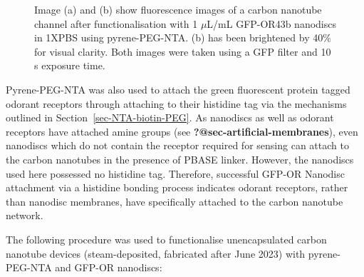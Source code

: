 \documentclass[
  a4paper,
]{scrbook}
\begin{document}
\begin{figure}
\begin{minipage}[t]{0.47\linewidth}
{{}

}

\subcaption{\label{fig-PPN-GFP-OR-2}}
\end{minipage}%

\caption{\label{fig-OR-GFP-PPN}Image (a) and (b) show fluorescence
images of a carbon nanotube channel after functionalisation with 1
\(\mu\)L/mL GFP-OR43b nanodiscs in 1XPBS using pyrene-PEG-NTA. (b) has
been brightened by 40\% for visual clarity. Both images were taken using
a GFP filter and 10 s exposure time.}

\end{figure}

Pyrene-PEG-NTA was also used to attach the green fluorescent protein
tagged odorant receptors through attaching to their histidine tag via
the mechanisms outlined in Section~\ref{sec-NTA-biotin-PEG}. As
nanodiscs as well as odorant receptors have attached amine groups (see
\textbf{?@sec-artificial-membranes}), even nanodiscs which do not
contain the receptor required for sensing can attach to the carbon
nanotubes in the presence of PBASE linker. However, the nanodiscs used
here possessed no histidine tag. Therefore, successful GFP-OR Nanodisc
attachment via a histidine bonding process indicates odorant receptors,
rather than nanodisc membranes, have specifically attached to the carbon
nanotube network.

The following procedure was used to functionalise unencapsulated carbon
nanotube devices (steam-deposited, fabricated after June 2023) with
pyrene-PEG-NTA and GFP-OR nanodiscs:
\end{document}
